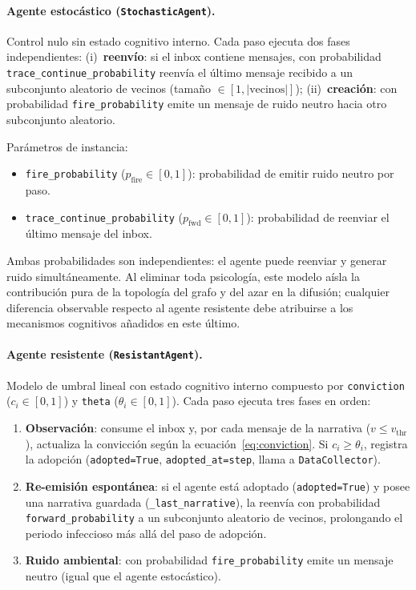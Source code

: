\paragraph{Agente estocástico (\texttt{StochasticAgent}).}
Control nulo sin estado cognitivo interno. Cada paso ejecuta dos fases independientes: (i)~\textbf{reenvío}: si el inbox contiene mensajes, con probabilidad \texttt{trace\_continue\_probability} reenvía el último mensaje recibido a un subconjunto aleatorio de vecinos (tamaño $\in [1, |\text{vecinos}|]$); (ii)~\textbf{creación}: con probabilidad \texttt{fire\_probability} emite un mensaje de ruido neutro hacia otro subconjunto aleatorio.

\noindent Parámetros de instancia:
\begin{itemize}[noitemsep]
  \item \texttt{fire\_probability} ($p_{\text{fire}} \in [0,1]$): probabilidad de emitir ruido neutro por paso.
  \item \texttt{trace\_continue\_probability} ($p_{\text{fwd}} \in [0,1]$): probabilidad de reenviar el último mensaje del inbox.
\end{itemize}

\noindent Ambas probabilidades son independientes: el agente puede reenviar y generar ruido simultáneamente. Al eliminar toda psicología, este modelo aísla la contribución pura de la topología del grafo y del azar en la difusión; cualquier diferencia observable respecto al agente resistente debe atribuirse a los mecanismos cognitivos añadidos en este último.

\paragraph{Agente resistente (\texttt{ResistantAgent}).}
Modelo de umbral lineal con estado cognitivo interno compuesto por \texttt{conviction} ($c_i \in [0,1]$) y \texttt{theta} ($\theta_i \in [0,1]$). Cada paso ejecuta tres fases en orden:

\begin{enumerate}[noitemsep]
  \item \textbf{Observación}: consume el inbox y, por cada mensaje de la narrativa ($v \leq v_{\text{thr}}$), actualiza la convicción según la ecuación~\eqref{eq:conviction}. Si $c_i \geq \theta_i$, registra la adopción (\texttt{adopted=True}, \texttt{adopted\_at=step}, llama a \texttt{DataCollector}).
  \item \textbf{Re-emisión espontánea}: si el agente está adoptado (\texttt{adopted=True}) y posee una narrativa guardada (\texttt{\_last\_narrative}), la reenvía con probabilidad \texttt{forward\_probability} a un subconjunto aleatorio de vecinos, prolongando el periodo infeccioso más allá del paso de adopción.
  \item \textbf{Ruido ambiental}: con probabilidad \texttt{fire\_probability} emite un mensaje neutro (igual que el agente estocástico).
\end{enumerate}

